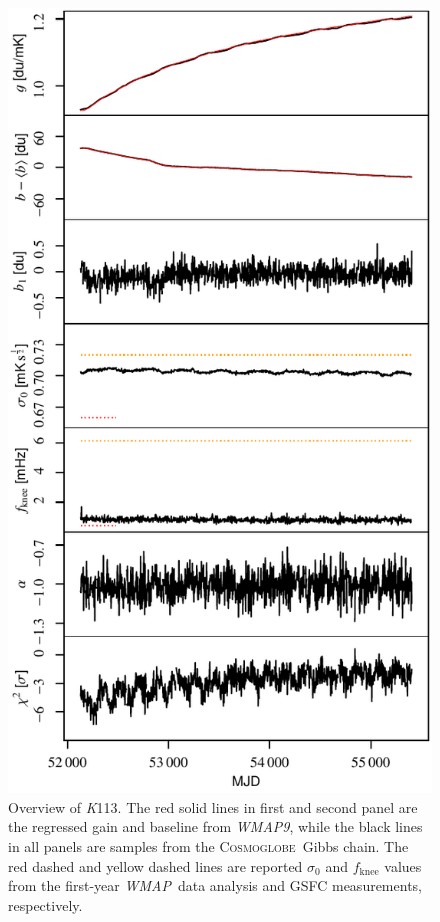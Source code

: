 \documentclass[twocolumn]{../../common/aa}
\def\WMAP{\emph{WMAP}}
\def\WMAPnine{\emph{WMAP9}}
\newcommand{\cosmoglobe}{\textsc{Cosmoglobe}}
\newcommand{\K}[0]{\textit K}
\begin{document}
\begin{figure}[t]
	\centering
	\includegraphics[width=\linewidth]{figures/instpar_CG_K113_v1.pdf}
	\caption{Overview of \K113. The red solid lines in first and second panel  are the regressed gain and baseline from \WMAPnine, while the black lines in all panels are samples from the \cosmoglobe\ Gibbs chain. The red dashed and yellow dashed lines are reported $\sigma_0$ and $f_\mathrm{knee}$ values from the first-year \WMAP\ data analysis and GSFC measurements, respectively.}
	\label{fig:inst_K113}
\end{figure}
\end{document}
